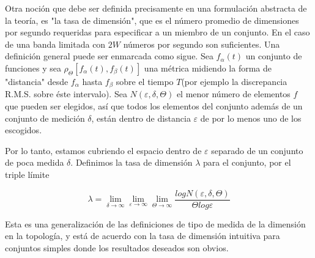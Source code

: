 Otra noci\'on que debe ser definida precisamente en una formulaci\'on abstracta de la teor\'ia,
es "la tasa de dimensi\'on", que es el n\'umero promedio de dimensiones por segundo requeridas
para especificar a un miembro de un conjunto. En el caso de una banda limitada con $2W$ 
n\'umeros por segundo son suficientes. Una definici\'on general puede ser enmarcada como sigue. 
Sea $f_{\alpha}(t)$ un conjunto de funciones y sea $\rho_{\Theta} \left [f_{\alpha}(t),f_{\beta}(t) \right ]$ 
una m\'etrica midiendo la forma de "distancia" desde $f_{\alpha}$ hasta $f_{\beta}$ sobre el tiempo 
$T$(por ejemplo la discrepancia R.M.S. sobre \'este intervalo). Sea $N(\varepsilon, \delta, \Theta)$ el 
menor n\'umero de elementos $f$ que pueden ser elegidos, as\'i que todos los elementos del conjunto 
adem\'as de un conjunto de medici\'on $\delta$, est\'an dentro de distancia $\varepsilon$ de por lo menos 
uno de los escogidos.

Por lo tanto, estamos cubriendo el espacio dentro de $\varepsilon$ separado de un conjunto de
poca medida $\delta$. Definimos la tasa de dimensi\'on $\lambda$ para el conjunto, por el
triple l\'imite

\begin{equation} \lambda = \lim_{\delta \to \infty} \lim_{\varepsilon \to \infty} \lim_{\Theta \to \infty} 
\frac{logN(\varepsilon, \delta, \Theta)}{\Theta log \varepsilon} \end{equation}

Esta es una generalizaci\'on de las definiciones de tipo de medida de la dimensi\'on en la
topolog\'ia, y est\'a de acuerdo con la tasa de dimensi\'on intuitiva para conjuntos
simples donde los resultados deseados son obvios.
							

